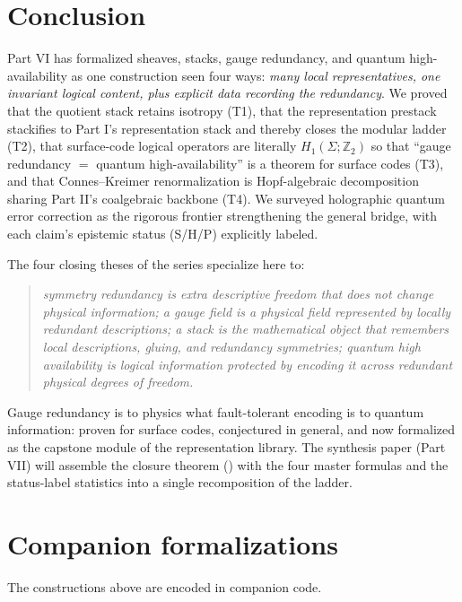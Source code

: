 \documentclass[12pt]{article}
\theoremstyle{definition}
\theoremstyle{remark}
\newcommand{\ZZ}{\mathbb{Z}}
\newcommand{\Ss}{\textsf{S}}
\newcommand{\Hh}{\textsf{H}}
\newcommand{\Pp}{\textsf{P}}
\begin{document}
\section{Conclusion}
\label{sec:conclusion}

Part VI has formalized sheaves, stacks, gauge redundancy, and quantum high-availability
as one construction seen four ways: \emph{many local representatives, one invariant
logical content, plus explicit data recording the redundancy}. We proved that the
quotient stack retains isotropy (T1), that the representation prestack stackifies to
Part I's representation stack and thereby closes the modular ladder (T2), that
surface-code logical operators are literally $H_1(\Sigma;\ZZ_2)$ so that ``gauge
redundancy $=$ quantum high-availability'' is a theorem for surface codes (T3), and that
Connes--Kreimer renormalization is Hopf-algebraic decomposition sharing Part II's
coalgebraic backbone (T4). We surveyed holographic quantum error correction as the
rigorous frontier strengthening the general bridge, with each claim's epistemic status
(\Ss/\Hh/\Pp) explicitly labeled.

The four closing theses of the series specialize here to:
\begin{quote}\itshape
symmetry redundancy is extra descriptive freedom that does not change physical
information; a gauge field is a physical field represented by locally redundant
descriptions; a stack is the mathematical object that remembers local descriptions,
gluing, and redundancy symmetries; quantum high availability is logical information
protected by encoding it across redundant physical degrees of freedom.
\end{quote}
Gauge redundancy is to physics what fault-tolerant encoding is to quantum information:
proven for surface codes, conjectured in general, and now formalized as the capstone
module of the representation library. The synthesis paper (Part VII) will assemble the
closure theorem () with the four master formulas and the status-label
statistics into a single recomposition of the ladder.

\section*{Companion formalizations}

\raggedright
The constructions above are encoded in companion code.
\end{document}
